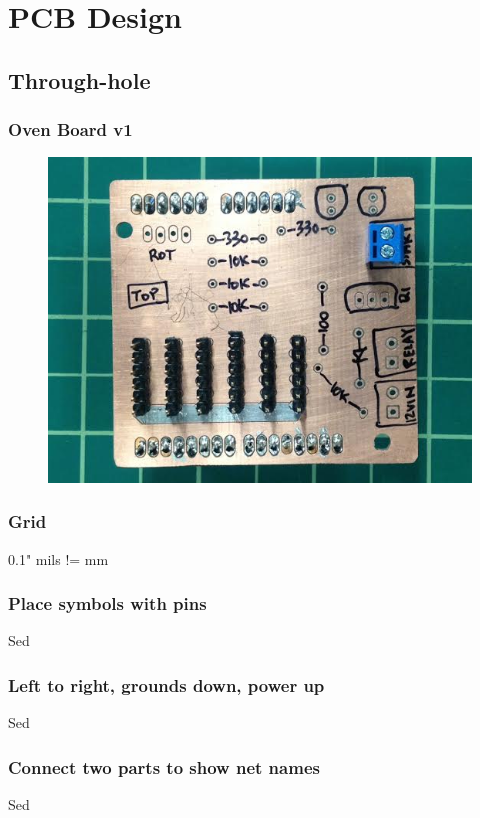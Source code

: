 \documentclass{beamer}
\begin{document}
\section{PCB Design} 
\subsection{Through-hole}
\begin{frame}
\frametitle{Oven Board v1}
\begin{figure}
\includegraphics[width=0.8\linewidth]{ovenboard-top.png}
\end{figure}
\end{frame}

\begin{frame}
\frametitle{Grid}
0.1"
mils != mm
\end{frame}


\begin{frame}
\frametitle{Place symbols with pins}
Sed 
\end{frame}


\begin{frame}
\frametitle{Left to right, grounds down, power up}
Sed 
\end{frame}


\begin{frame}
\frametitle{Connect two parts to show net names}
Sed 
\end{frame}
\end{document}

